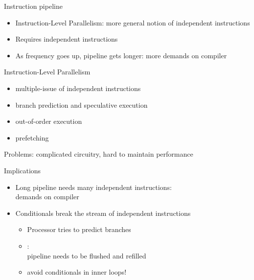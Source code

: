 \begin{frame}{Instruction pipeline}
  \begin{itemize}
  \item Instruction-Level Parallelism: more general notion of 
    independent instructions
  \item Requires independent instructions
  \item As frequency goes up, pipeline gets longer: more demands on compiler
  \end{itemize}
\end{frame}

\begin{frame}{Instruction-Level Parallelism}
  \begin{itemize}
  \item multiple-issue of independent instructions
  \item branch prediction and speculative execution
  \item out-of-order execution
  \item prefetching
  \end{itemize}
  Problems: complicated circuitry, hard to maintain performance
\end{frame}

\begin{frame}{Implications}
  \begin{itemize}
  \item Long pipeline needs many independent instructions:\\
    demands on compiler
  \item Conditionals break the stream of independent instructions
    \begin{itemize}
    \item Processor tries to predict branches
    \item {}:\\
      pipeline needs to be flushed and refilled
    \item avoid conditionals in inner loops!
    \end{itemize}
  \end{itemize}
\end{frame}

